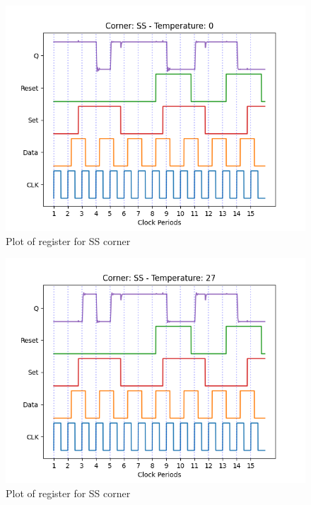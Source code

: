 \begin{figure}[H]
    \centering
    \includegraphics[width=\textwidth]{Figures/Aimspice_Plots/SS_0.png}
    \caption{Plot of register for SS corner}
    \label{fig:SS0}
\end{figure}

\begin{figure}[H]
    \centering
    \includegraphics[width=\textwidth]{Figures/Aimspice_Plots/SS_27.png}
    \caption{Plot of register for SS corner}
    \label{fig:SS27}
\end{figure}


